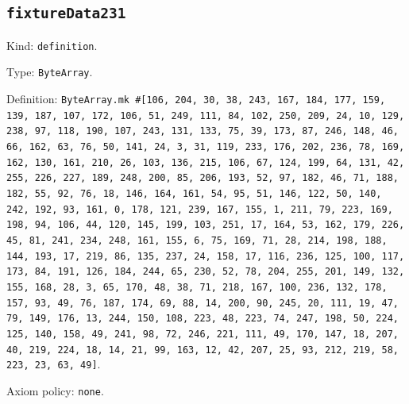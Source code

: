 \documentclass[11pt]{article}
\begin{document}
\subsection*{\texttt{fixtureData231}}
\noindent Kind: \texttt{definition}.\par
\noindent Type: \texttt{ByteArray}.\par
\noindent Definition: \texttt{ByteArray.mk \#[106, 204, 30, 38, 243, 167, 184, 177, 159, 139, 187, 107, 172, 106, 51, 249, 111, 84, 102, 250, 209, 24, 10, 129, 238, 97, 118, 190, 107, 243, 131, 133, 75, 39, 173, 87, 246, 148, 46, 66, 162, 63, 76, 50, 141, 24, 3, 31, 119, 233, 176, 202, 236, 78, 169, 162, 130, 161, 210, 26, 103, 136, 215, 106, 67, 124, 199, 64, 131, 42, 255, 226, 227, 189, 248, 200, 85, 206, 193, 52, 97, 182, 46, 71, 188, 182, 55, 92, 76, 18, 146, 164, 161, 54, 95, 51, 146, 122, 50, 140, 242, 192, 93, 161, 0, 178, 121, 239, 167, 155, 1, 211, 79, 223, 169, 198, 94, 106, 44, 120, 145, 199, 103, 251, 17, 164, 53, 162, 179, 226, 45, 81, 241, 234, 248, 161, 155, 6, 75, 169, 71, 28, 214, 198, 188, 144, 193, 17, 219, 86, 135, 237, 24, 158, 17, 116, 236, 125, 100, 117, 173, 84, 191, 126, 184, 244, 65, 230, 52, 78, 204, 255, 201, 149, 132, 155, 168, 28, 3, 65, 170, 48, 38, 71, 218, 167, 100, 236, 132, 178, 157, 93, 49, 76, 187, 174, 69, 88, 14, 200, 90, 245, 20, 111, 19, 47, 79, 149, 176, 13, 244, 150, 108, 223, 48, 223, 74, 247, 198, 50, 224, 125, 140, 158, 49, 241, 98, 72, 246, 221, 111, 49, 170, 147, 18, 207, 40, 219, 224, 18, 14, 21, 99, 163, 12, 42, 207, 25, 93, 212, 219, 58, 223, 23, 63, 49]}.\par
\noindent Axiom policy: \texttt{none}.\par
\end{document}
